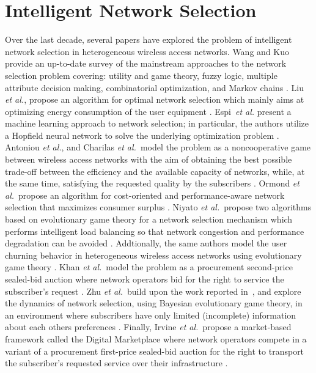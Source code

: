 \section{Intelligent Network Selection} %
\label{sec:intelligent_network_selection}
Over the last decade, several papers have explored the problem of intelligent network selection in heterogeneous wireless access networks. Wang and Kuo provide an up-to-date survey of the mainstream approaches to the network selection problem covering: utility and game theory, fuzzy logic, multiple attribute decision making, combinatorial optimization, and Markov chains \cite{LushengKuo2013}. Liu \emph{et al.}, propose an algorithm for optimal network selection which mainly aims at optimizing energy consumption of the user equipment \cite{Liu2009}. Espi~\emph{et al.} present a machine learning approach to network selection; in particular, the authors utilize a Hopfield neural network to solve the underlying optimization problem \cite{Espi10}. Antoniou \emph{et al.}, and Charilas \emph{et al.}~model the problem as a noncooperative game between wireless access networks with the aim of obtaining the best possible trade-off between the efficiency and the available capacity of networks, while, at the same time, satisfying the requested quality by the subscribers \cite{Antoniou07, Charilas08}. Ormond \emph{et al.}~propose an algorithm for cost-oriented and performance-aware network selection that maximizes consumer surplus \cite{OrmondCS106, OrmondCS206}. Niyato \emph{et al.}~propose two algorithms based on evolutionary game theory for a network selection mechanism which performs intelligent load balancing so that network congestion and performance degradation can be avoided \cite{Niyato09}. Addtionally, the same authors model the user churning behavior in heterogeneous wireless access networks using evolutionary game theory \cite{NiyatoHossainConf2008}. Khan \emph{et al.}~model the problem as a procurement second-price sealed-bid auction where network operators bid for the right to service the subscriber's request \cite{Khan110, Khan210}. Zhu \emph{et al.}~build upon the work reported in~\cite{Niyato09}, and explore the dynamics of network selection, using Bayesian evolutionary game theory, in an environment where subscribers have only limited (incomplete) information about each others preferences \cite{ZhuNiyato2010}. Finally, Irvine \emph{et al.}~propose a market-based framework called the Digital Marketplace where network operators compete in a variant of a procurement first-price sealed-bid auction for the right to transport the subscriber's requested service over their infrastructure \cite{DMLeBodic00, DMIrvine01, DMIrvine02}.

